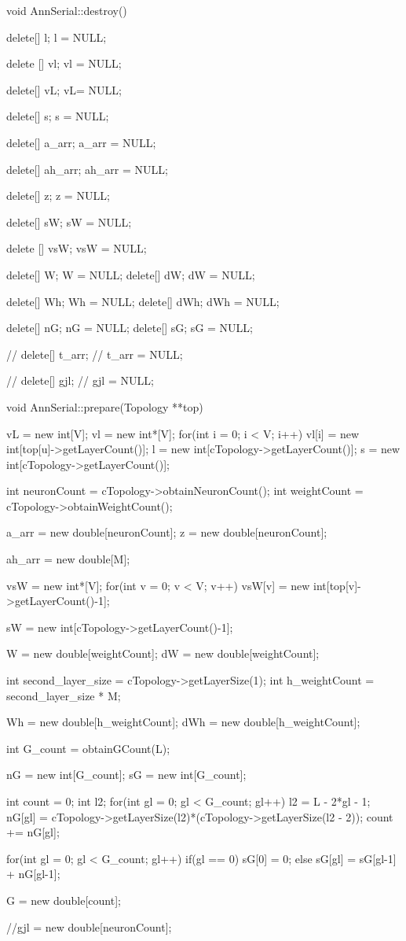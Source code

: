 void AnnSerial::destroy(){
	delete[] l;
	l = NULL;

  delete [] vl;
  vl = NULL;

  delete[] vL;
  vL= NULL;

	delete[] s;
	s = NULL;

	delete[] a\_arr;
	a\_arr = NULL;

  delete[] ah\_arr;
  ah\_arr = NULL;

	delete[] z;
	z = NULL;

	delete[] sW;
	sW = NULL;

  delete [] vsW;
  vsW = NULL;

	delete[] W;
	W = NULL;
	delete[] dW;
	dW = NULL;

  delete[] Wh;
  Wh = NULL;
  delete[] dWh;
  dWh = NULL;

  delete[] nG;
  nG = NULL;
  delete[] sG;
  sG = NULL;


	// delete[] t\_arr;
	// t\_arr = NULL;

	// delete[] gjl;
	// gjl = NULL;
}

void AnnSerial::prepare(Topology **top){

  vL = new int[V];
  vl = new int*[V];
  for(int i = 0; i < V; i++){
    vl[i] = new int[top[u]->getLayerCount()];
  }
	l = new int[cTopology->getLayerCount()];
	s = new int[cTopology->getLayerCount()];

	int neuronCount = cTopology->obtainNeuronCount();
	int weightCount = cTopology->obtainWeightCount();

	a\_arr = new double[neuronCount];
	z = new double[neuronCount];

  ah\_arr = new double[M];

  vsW = new int*[V];
  for(int v = 0; v < V; v++)
    vsW[v] = new int[top[v]->getLayerCount()-1];

	sW = new int[cTopology->getLayerCount()-1];

	W = new double[weightCount];
	dW = new double[weightCount];

  int second\_layer\_size = cTopology->getLayerSize(1);
  int h\_weightCount = second\_layer\_size * M;

  Wh = new double[h\_weightCount];
  dWh = new double[h\_weightCount];

  int G\_count = obtainGCount(L);


  nG = new int[G\_count];
  sG = new int[G\_count];

  int count = 0;
  int l2;
  for(int gl = 0; gl < G\_count; gl++){
    l2 = L - 2*gl - 1;
    nG[gl] = cTopology->getLayerSize(l2)*(cTopology->getLayerSize(l2 - 2));
    count += nG[gl];
  }


  for(int gl = 0; gl < G\_count; gl++){
    if(gl == 0)
      sG[0] = 0;
    else
      sG[gl] = sG[gl-1] + nG[gl-1];
  }

  G = new double[count];


	//gjl = new double[neuronCount];
}

